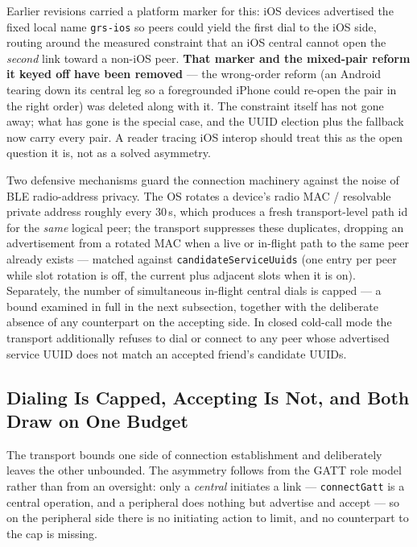 \documentclass[11pt]{report}
\newcommand{\code}[1]{\texttt{\small #1}}
\begin{document}
Earlier revisions carried a platform marker for this: iOS devices advertised the fixed local name \code{grs-ios} so peers could yield the first dial to the iOS side, routing around the measured constraint that an iOS central cannot open the \emph{second} link toward a non-iOS peer. \textbf{That marker and the mixed-pair reform it keyed off have been removed} --- the wrong-order reform (an Android tearing down its central leg so a foregrounded iPhone could re-open the pair in the right order) was deleted along with it. The constraint itself has not gone away; what has gone is the special case, and the UUID election plus the fallback now carry every pair. A reader tracing iOS interop should treat this as the open question it is, not as a solved asymmetry.

Two defensive mechanisms guard the connection machinery against the noise of BLE radio-address privacy. The OS rotates a device's radio MAC / resolvable private address roughly every 30\,s, which produces a fresh transport-level path id for the \emph{same} logical peer; the transport suppresses these duplicates, dropping an advertisement from a rotated MAC when a live or in-flight path to the same peer already exists --- matched against \code{candidateServiceUuids} (one entry per peer while slot rotation is off, the current plus adjacent slots when it is on). Separately, the number of simultaneous in-flight central dials is capped --- a bound examined in full in the next subsection, together with the deliberate absence of any counterpart on the accepting side. In closed cold-call mode the transport additionally refuses to dial or connect to any peer whose advertised service UUID does not match an accepted friend's candidate UUIDs.

\subsection{Dialing Is Capped, Accepting Is Not, and Both Draw on One Budget}

The transport bounds one side of connection establishment and deliberately leaves the other unbounded. The asymmetry follows from the GATT role model rather than from an oversight: only a \emph{central} initiates a link --- \code{connectGatt} is a central operation, and a peripheral does nothing but advertise and accept --- so on the peripheral side there is no initiating action to limit, and no counterpart to the cap is missing.
\end{document}
